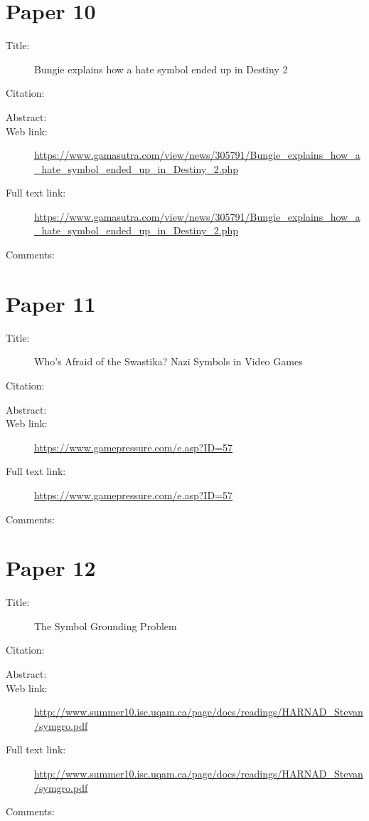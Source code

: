 \documentclass{scrartcl}
\begin{document}
\section*{Paper 10}
\begin{description}
\item[Title:] Bungie explains how a hate symbol ended up in Destiny 2
\item[Citation:] \cite{kerr}
\item[Abstract:]
\item[Web link:]\url  {https://www.gamasutra.com/view/news/305791/Bungie_explains_how_a_hate_symbol_ended_up_in_Destiny_2.php}
\item[Full text link:] \url {https://www.gamasutra.com/view/news/305791/Bungie_explains_how_a_hate_symbol_ended_up_in_Destiny_2.php}
\item[Comments:]
\end{description}

\section*{Paper 11}
\begin{description}
\item[Title:] Who's Afraid of the Swastika? Nazi Symbols in Video Games
\item[Citation:] \cite{jakub}
\item[Abstract:]
\item[Web link:] \url {https://www.gamepressure.com/e.asp?ID=57}
\item[Full text link:]\url {https://www.gamepressure.com/e.asp?ID=57}
\item[Comments:] 
\end{description}

\section*{Paper 12}
\begin{description}
\item[Title:] The Symbol Grounding Problem
\item[Citation:] \cite{harnad}
\item[Abstract:]
\item[Web link:]\url {http://www.summer10.isc.uqam.ca/page/docs/readings/HARNAD_Stevan/symgro.pdf}
\item[Full text link:]\url {http://www.summer10.isc.uqam.ca/page/docs/readings/HARNAD_Stevan/symgro.pdf}
\item[Comments:]
\end{description}



\end{document}
